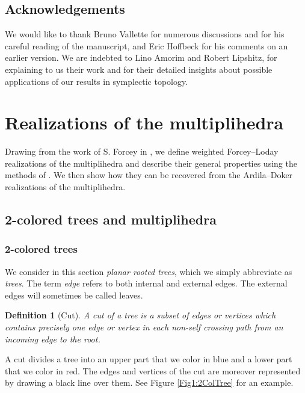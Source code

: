 \documentclass[twoside, 12pt]{amsart}
\newtheorem{definition}{Definition}[section]
\theoremstyle{remark}
\begin{document}
\subsection*{Acknowledgements} 
We would like to thank Bruno Vallette for numerous discussions and for his careful reading of the manuscript, and Eric Hoffbeck for his comments on an earlier version.
We are indebted to Lino Amorim and Robert Lipshitz, for explaining to us their work and for their detailed insights about possible applications of our results in symplectic topology.



\section{Realizations of the multiplihedra} 
\label{sec:I}

Drawing from the work of S. Forcey in \cite{Forcey08}, we define weighted Forcey--Loday realizations of the multiplihedra and describe their general properties using the methods of \cite{MTTV19}.
We then show how they can be recovered from the Ardila--Doker realizations of the multiplihedra.


\subsection{2-colored trees and multiplihedra}

\subsubsection{2-colored trees}

We consider in this section \textit{planar rooted trees}, which we simply abbreviate as \textit{trees}. The term \emph{edge} refers to both internal and external edges. The external edges will sometimes be called leaves. 

\begin{definition}[Cut]
A \emph{cut} of a tree is a subset of edges or vertices which contains precisely one edge or vertex in each non-self crossing path from an incoming edge to the root.
\end{definition}

\noindent A cut divides a tree into an upper part that we color in blue and a lower part that we color in red. The edges and vertices of the cut are moreover represented by drawing a black line over them. See Figure \ref{Fig1:2ColTree} for an example. 
\end{document}

